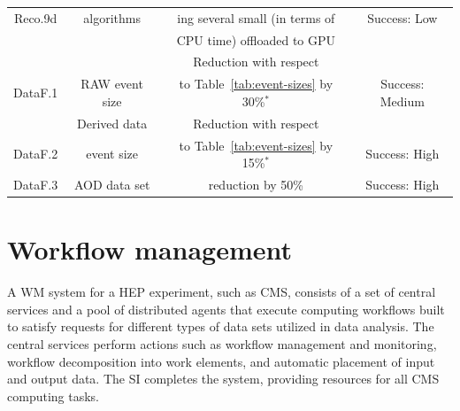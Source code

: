 \begin{table}[tbph]
\begin{tabular}{|c|c|c|c|}
    \cellcolor{tablerowheader}
    Reco.9d   & algorithms                       & ing several small (in terms of                    & Success: Low     \\ 
    \cellcolor{tablerowheader}
              &       &  CPU time) offloaded to GPU           &                  \\ \hline
    \cellcolor{tablerowheader}
              &                                  &  Reduction with respect                           &                  \\
    \cellcolor{tablerowheader}
    DataF.1   &  RAW event size            &  to Table~\ref{tab:event-sizes}  by 30\%$^*$      & Success: Medium  \\  \hline
    \cellcolor{tablerowheader}
        \cellcolor{tablerowheader}
              &  Derived data                    &  Reduction with respect                           &                  \\
    \cellcolor{tablerowheader}
    DataF.2   &  event size                      &  to Table~\ref{tab:event-sizes} by 15\%$^*$       & Success: High    \\ \hline
    \cellcolor{tablerowheader}
    DataF.3   &  AOD data set               &  reduction by 50\%                                & Success: High    \\ \hline

    \end{tabular}
    \label{tab:reco-improvements}
\end{table}

\clearpage

%
%
% 
\section{Workflow management}
\label{sec:Workflow}

A \gls{WM} system for a \gls{HEP} experiment, such as CMS, consists of a set of central services and a pool of distributed agents that execute computing workflows built to satisfy requests for different types of data sets utilized in data analysis. The central services perform actions such as workflow management and monitoring, workflow decomposition into work elements, and automatic placement of input and output data. The \gls{SI} completes the system, providing resources for all CMS computing tasks.

